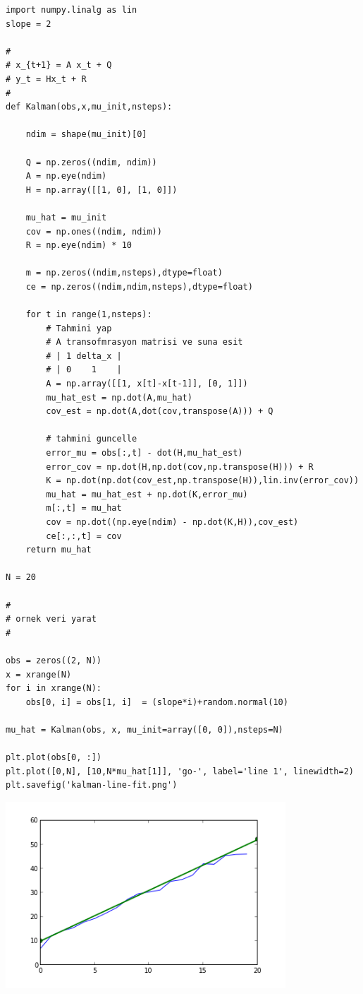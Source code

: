 \documentclass[12pt,fleqn]{article}\usepackage{../common}
\begin{document}
\begin{verbatim}
import numpy.linalg as lin
slope = 2

#
# x_{t+1} = A x_t + Q
# y_t = Hx_t + R
#
def Kalman(obs,x,mu_init,nsteps):

    ndim = shape(mu_init)[0]

    Q = np.zeros((ndim, ndim))
    A = np.eye(ndim)
    H = np.array([[1, 0], [1, 0]])

    mu_hat = mu_init
    cov = np.ones((ndim, ndim))
    R = np.eye(ndim) * 10
    
    m = np.zeros((ndim,nsteps),dtype=float)
    ce = np.zeros((ndim,ndim,nsteps),dtype=float)
    
    for t in range(1,nsteps):
        # Tahmini yap
        # A transofmrasyon matrisi ve suna esit
        # | 1 delta_x |
        # | 0    1    |
        A = np.array([[1, x[t]-x[t-1]], [0, 1]])
        mu_hat_est = np.dot(A,mu_hat)
        cov_est = np.dot(A,dot(cov,transpose(A))) + Q

        # tahmini guncelle
        error_mu = obs[:,t] - dot(H,mu_hat_est)
        error_cov = np.dot(H,np.dot(cov,np.transpose(H))) + R
        K = np.dot(np.dot(cov_est,np.transpose(H)),lin.inv(error_cov))
        mu_hat = mu_hat_est + np.dot(K,error_mu)
        m[:,t] = mu_hat
        cov = np.dot((np.eye(ndim) - np.dot(K,H)),cov_est)
        ce[:,:,t] = cov
    return mu_hat
        
N = 20

#
# ornek veri yarat
#

obs = zeros((2, N))
x = xrange(N)
for i in xrange(N):
    obs[0, i] = obs[1, i]  = (slope*i)+random.normal(10)
    
mu_hat = Kalman(obs, x, mu_init=array([0, 0]),nsteps=N)

plt.plot(obs[0, :])
plt.plot([0,N], [10,N*mu_hat[1]], 'go-', label='line 1', linewidth=2)
plt.savefig('kalman-line-fit.png')
\end{verbatim}

\includegraphics[height=7cm]{kalman-line-fit.png}
\end{document}
